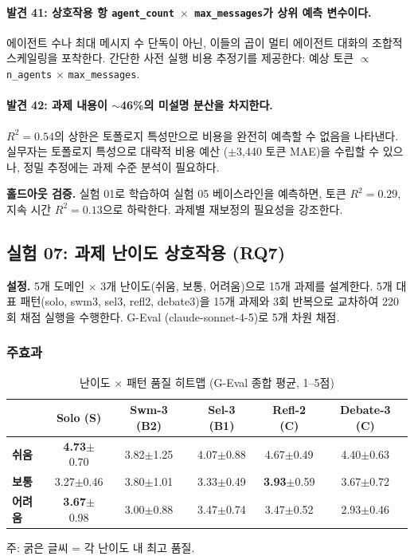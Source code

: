 \paragraph{발견 41: 상호작용 항 \texttt{agent\_count $\times$ max\_messages}가 상위 예측 변수이다.}
에이전트 수나 최대 메시지 수 단독이 아닌, 이들의 곱이 멀티 에이전트 대화의 조합적 스케일링을 포착한다. 간단한 사전 실행 비용 추정기를 제공한다: 예상 토큰 $\propto$ \texttt{n\_agents} $\times$ \texttt{max\_messages}.

\paragraph{발견 42: 과제 내용이 $\sim$46\%의 미설명 분산을 차지한다.}
$R^{2}=0.54$의 상한은 토폴로지 특성만으로 비용을 완전히 예측할 수 없음을 나타낸다. 실무자는 토폴로지 특성으로 대략적 비용 예산 ($\pm$3,440 토큰 MAE)을 수립할 수 있으나, 정밀 추정에는 과제 수준 분석이 필요하다.

\textbf{홀드아웃 검증.} 실험 01로 학습하여 실험 05 베이스라인을 예측하면, 토큰 $R^{2}=0.29$, 지속 시간 $R^{2}=0.13$으로 하락한다. 과제별 재보정의 필요성을 강조한다.

\subsection{실험 07: 과제 난이도 상호작용 (RQ7)}
\label{sec:exp07}

\textbf{설정.} 5개 도메인 $\times$ 3개 난이도(쉬움, 보통, 어려움)으로 15개 과제를 설계한다. 5개 대표 패턴(solo, swm3, sel3, refl2, debate3)을 15개 과제와 3회 반복으로 교차하여 220회 채점 실행을 수행한다. G-Eval (claude-sonnet-4-5)로 5개 차원 채점.

\subsubsection{주효과}

\begin{table}[H]
\centering
\caption{난이도 $\times$ 패턴 품질 히트맵 (G-Eval 종합 평균, 1--5점)}
\label{tab:difficulty-heatmap}
{\small
\begin{tabular}{lccccc}
\toprule
 & Solo (S) & Swm-3 (B2) & Sel-3 (B1) & Refl-2 (C) & Debate-3 (C) \\
\midrule
\textbf{쉬움}   & \textbf{4.73}$\pm$0.70 & 3.82$\pm$1.25 & 4.07$\pm$0.88 & 4.67$\pm$0.49 & 4.40$\pm$0.63 \\
\textbf{보통}   & 3.27$\pm$0.46 & 3.80$\pm$1.01 & 3.33$\pm$0.49 & \textbf{3.93}$\pm$0.59 & 3.67$\pm$0.72 \\
\textbf{어려움} & \textbf{3.67}$\pm$0.98 & 3.00$\pm$0.88 & 3.47$\pm$0.74 & 3.47$\pm$0.52 & 2.93$\pm$0.46 \\
\bottomrule
\end{tabular}
}

\smallskip
{\footnotesize 주: 굵은 글씨 = 각 난이도 내 최고 품질.}
\end{table}


